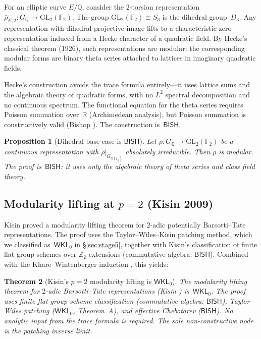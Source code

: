 \documentclass[11pt]{article}
\theoremstyle{plain}
\newtheorem{theorem}{Theorem}[section]
\newtheorem{proposition}[theorem]{Proposition}
\theoremstyle{definition}
\theoremstyle{remark}
\newcommand{\Z}{\mathbb{Z}}
\newcommand{\Q}{\mathbb{Q}}
\newcommand{\R}{\mathbb{R}}
\newcommand{\F}{\mathbb{F}}
\newcommand{\GL}{\mathrm{GL}}
\newcommand{\BISH}{\mathsf{BISH}}
\newcommand{\WKL}{\mathsf{WKL}_0}
\begin{document}
For an elliptic curve $E/\Q$, consider the $2$-torsion
representation $\bar{\rho}_{E,2} : G_\Q \to \GL_2(\F_2)$.
The group $\GL_2(\F_2) \cong S_3$ is the dihedral group~$D_3$.
Any representation with dihedral projective image lifts to a
characteristic zero representation induced from a
Hecke character of a quadratic field.  By Hecke's classical
theorem (1926), such representations are modular: the
corresponding modular forms are binary theta series attached
to lattices in imaginary quadratic fields.

Hecke's construction avoids the trace formula entirely---it
uses lattice sums and the algebraic theory of quadratic forms,
with no $L^2$ spectral decomposition and no continuous spectrum.
The functional equation for the theta series requires
Poisson summation over~$\R$ (Archimedean analysis), but
Poisson summation is constructively valid
(Bishop \cite{Bishop1967}).  The construction is~$\BISH$.

\begin{proposition}[Dihedral base case is $\BISH$]%
\label{prop:dihedral}
Let $\bar{\rho} : G_\Q \to \GL_2(\F_2)$ be a continuous
representation with $\bar{\rho}|_{G_{\Q(\zeta_2)}}$ absolutely
irreducible.  Then $\bar{\rho}$ is modular.  The proof is~$\BISH$:
it uses only the algebraic theory of theta series and class field
theory.
\end{proposition}

\subsection{Modularity lifting at $p = 2$ (Kisin 2009)}

Kisin \cite{Kisin2009} proved a modularity lifting theorem for
$2$-adic potentially Barsotti--Tate representations.  The proof
uses the Taylor--Wiles--Kisin patching method, which we
classified as~$\WKL$ in \S\ref{sec:stage5}, together with
Kisin's classification of finite flat group schemes over
$\Z_2$-extensions (commutative algebra: $\BISH$).
Combined with the Khare--Wintenberger induction
\cite{KhareWintenberger2009I, KhareWintenberger2009II}, this
yields:

\begin{theorem}[Kisin's $p = 2$ modularity lifting is $\WKL$]%
\label{thm:kisin2}
The modularity lifting theorem for $2$-adic Barsotti--Tate
representations (Kisin \cite{Kisin2009}) is~$\WKL$.
The proof uses finite flat group scheme classification
(commutative algebra: $\BISH$), Taylor--Wiles patching ($\WKL$,
Theorem~A), and effective Chebotarev ($\BISH$).
No analytic input from the trace formula is required.  The sole
non-constructive node is the patching inverse limit.
\end{theorem}
\end{document}
